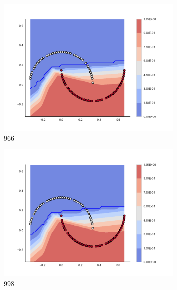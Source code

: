 \begin{figure}[h]
\begin{subfigure}[b]{0.09\textwidth}
    \includegraphics[clip, trim=2.35cm 1.75cm 4.5cm 0cm,width=\textwidth]{img/convergence/966.pdf}
    \caption{966}
    \label{fig:convergence_966}
\end{subfigure}
%
\begin{subfigure}[b]{0.09\textwidth}
    \includegraphics[clip, trim=2.35cm 1.75cm 4.5cm 0cm,width=\textwidth]{img/convergence/998.pdf}
    \caption{998}
    \label{fig:convergence_998}
\end{subfigure}
%
\begin{subfigure}[b]{0.09\textwidth}

\end{subfigure}
\end{figure}
